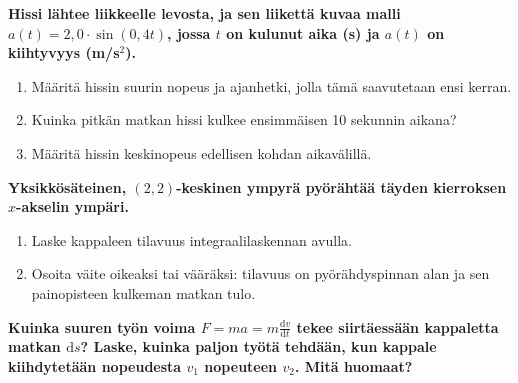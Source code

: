 \documentclass[12pt,finnish]{exam}
\begin{document}
\begin{questions}
\bfseries
\question
\mdseries
Hissi lähtee liikkeelle levosta, ja sen liikettä kuvaa malli \(a(t)=2,0\cdot \sin{(0,4t)}\), jossa \(t\) on kulunut aika (s) ja \(a(t)\) on kiihtyvyys (m/s\(^2\)). 
\begin{enumerate}[label=\textbf{\alph*)}]
\item Määritä hissin suurin nopeus ja ajanhetki, jolla tämä saavutetaan ensi kerran.
\item Kuinka pitkän matkan hissi kulkee ensimmäisen 10 sekunnin aikana?
\item Määritä hissin keskinopeus edellisen kohdan aikavälillä.
\end{enumerate}

\bfseries
\question
\mdseries
Yksikkösäteinen, \((2, 2)\)-keskinen ympyrä pyörähtää täyden kierroksen \(x\)-akselin ympäri. 
\begin{enumerate}[label=\textbf{\alph*)}]
\item Laske kappaleen tilavuus integraalilaskennan avulla.
\item Osoita väite oikeaksi tai vääräksi: tilavuus on pyörähdyspinnan alan ja sen\\ painopisteen kulkeman matkan tulo.
\end{enumerate}

\bfseries
\question
\mdseries
Kuinka suuren työn voima \(\displaystyle F=ma=m\frac{\mathrm{d}v}{\mathrm{d}t}\) tekee siirtäessään kappaletta matkan \(\mathrm{d}s\)? Laske, kuinka paljon työtä tehdään, kun kappale kiihdytetään nopeudesta \(v_1\) nopeuteen \(v_2\). Mitä huomaat?

\end{questions}
\thispagestyle{empty}
\end{document}
